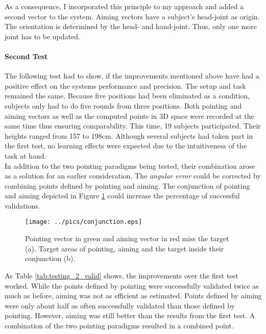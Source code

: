 As a consequence, I incorporated this principle to my approach and added a second vector to the system. Aiming vectors have a subject's head-joint as origin. The orientation is determined by the head- and hand-joint. Thus, only one more joint has to be updated.

\paragraph{Second Test} The following test had to show, if the improvements mentioned above have had a positive effect on the systems performance and precision. The setup and task remained the same. Because five positions had been eliminated as a condition, subjects only had to do five rounds from three positions. Both pointing and aiming vectors as well as the computed points in \ac{3D} space were recorded at the same time thus ensuring comparability. This time, 19 subjects participated. Their heights ranged from 157 to 198cm. Although several subjects had taken part in the first test, no learning effects were expected due to the intuitiveness of the task at hand. 
\\
In addition to the two pointing paradigms being tested, their combination arose as a solution for an earlier consideration. The \textit{angular error} could be corrected by combining points defined by pointing and aiming. The conjunction of pointing and aiming depicted in Figure \ref{fig:testing_2_conjunction} could increase the percentage of successful validations.
\begin{figure}[H]%
\texttt{[image: ../pics/conjunction.eps]}%
\caption{Pointing vector in green and aiming vector in red miss the target (a). Target areas of pointing, aiming and the target inside their conjunction (b).}%
\label{fig:testing_2_conjunction} %
\end{figure}

As Table \ref{tab:testing_2_valid} shows, the improvements over the first test worked. While the points defined by pointing were successfully validated twice as much as before, aiming was not as efficient as estimated. Points defined by aiming were only about half as often successfully validated than those defined by pointing. However, aiming was still better than the results from the first test. A combination of the two pointing paradigms resulted in a combined point. 

